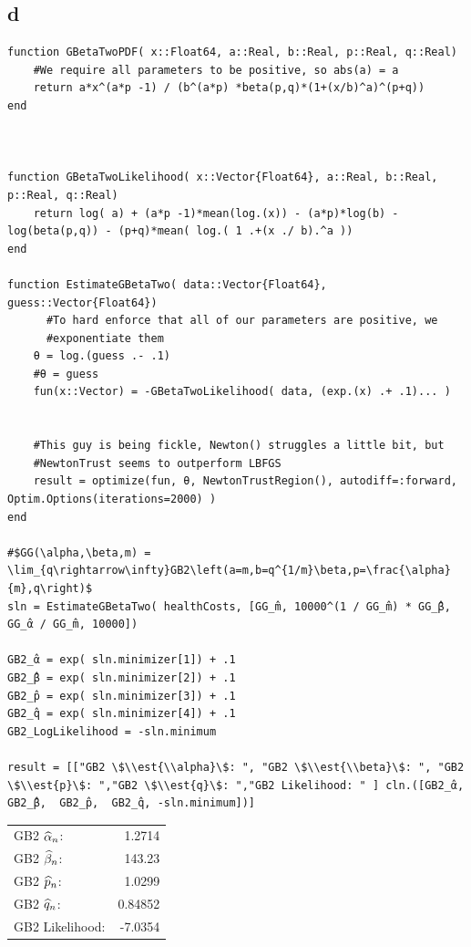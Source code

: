 \documentclass[12pt, letterpaper]{paper}
\begin{document}
\subsection{d}
\label{sec:org83e81e7}
\begin{verbatim}
function GBetaTwoPDF( x::Float64, a::Real, b::Real, p::Real, q::Real)
    #We require all parameters to be positive, so abs(a) = a
    return a*x^(a*p -1) / (b^(a*p) *beta(p,q)*(1+(x/b)^a)^(p+q))
end



function GBetaTwoLikelihood( x::Vector{Float64}, a::Real, b::Real, p::Real, q::Real)
    return log( a) + (a*p -1)*mean(log.(x)) - (a*p)*log(b) - log(beta(p,q)) - (p+q)*mean( log.( 1 .+(x ./ b).^a ))
end

function EstimateGBetaTwo( data::Vector{Float64}, guess::Vector{Float64})
      #To hard enforce that all of our parameters are positive, we
      #exponentiate them
    θ = log.(guess .- .1)
    #θ = guess
    fun(x::Vector) = -GBetaTwoLikelihood( data, (exp.(x) .+ .1)... )


    #This guy is being fickle, Newton() struggles a little bit, but
    #NewtonTrust seems to outperform LBFGS
    result = optimize(fun, θ, NewtonTrustRegion(), autodiff=:forward, Optim.Options(iterations=2000) )
end

#$GG(\alpha,\beta,m) = \lim_{q\rightarrow\infty}GB2\left(a=m,b=q^{1/m}\beta,p=\frac{\alpha}{m},q\right)$
sln = EstimateGBetaTwo( healthCosts, [GG_̂m, 10000^(1 / GG_̂m) * GG_̂β, GG_̂α / GG_̂m, 10000])

GB2_̂α = exp( sln.minimizer[1]) + .1
GB2_̂β = exp( sln.minimizer[2]) + .1
GB2_̂p = exp( sln.minimizer[3]) + .1
GB2_̂q = exp( sln.minimizer[4]) + .1
GB2_LogLikelihood = -sln.minimum

result = [["GB2 \$\\est{\\alpha}\$: ", "GB2 \$\\est{\\beta}\$: ", "GB2 \$\\est{p}\$: ","GB2 \$\\est{q}\$: ","GB2 Likelihood: " ] cln.([GB2_̂α, GB2_̂β,  GB2_̂p,  GB2_̂q, -sln.minimum])]
\end{verbatim}

\begin{center}
\begin{tabular}{lr}
GB2 \(\widehat{ \alpha }_{n}\): & 1.2714\\
GB2 \(\widehat{ \beta }_{n}\): & 143.23\\
GB2 \(\widehat{ p }_{n}\): & 1.0299\\
GB2 \(\widehat{ q }_{n}\): & 0.84852\\
GB2 Likelihood: & -7.0354\\
\end{tabular}
\end{center}
\end{document}
